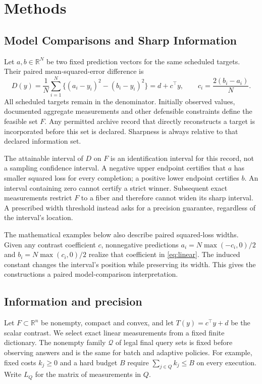 \documentclass[12pt]{article}
\begin{document}
\section{Methods}\label{sec:methods}
\subsection{Model Comparisons and Sharp Information}
Let $a,b\in\mathbb R^N$ be two fixed prediction vectors for the same
scheduled targets. Their paired mean-squared-error difference is
\begin{equation}
 D(y)=\frac1N\sum_{i=1}^N\{(a_i-y_i)^2-(b_i-y_i)^2\}
 =d+c^\top y,\qquad c_i=\frac{2(b_i-a_i)}N.
 \label{eq:linear}
\end{equation}
All scheduled targets remain in the denominator. Initially observed values,
documented aggregate measurements and other defensible constraints define
the feasible set $F$. Any permitted archive record that directly reconstructs
a target is incorporated before this set is declared. Sharpness is always
relative to that declared information set.

The attainable interval of $D$ on $F$ is an identification interval for
this record, not a sampling confidence interval. A negative upper endpoint
certifies that $a$ has smaller squared loss for every completion; a positive
lower endpoint certifies $b$. An interval containing zero cannot certify
a strict winner. Subsequent exact measurements restrict $F$ to a fiber and
therefore cannot widen its sharp interval. A prescribed width threshold
instead asks for a precision guarantee, regardless of the interval's location.

The mathematical examples below also describe paired squared-loss widths.
Given any contrast coefficient $c$, nonnegative predictions
$a_i=N\max(-c_i,0)/2$ and $b_i=N\max(c_i,0)/2$ realize that coefficient
in \eqref{eq:linear}. The induced constant changes the interval's position
while preserving its width. This gives the constructions a paired
model-comparison interpretation.

\subsection{Information and precision}
\label{sec:risk_setup}
Let $F\subset\mathbb R^n$ be nonempty, compact and convex, and let
$T(y)=c^\top y+d$ be the scalar contrast. We select exact linear
measurements from a fixed finite dictionary. The nonempty family
$\mathcal Q$ of legal final query sets is fixed before observing answers
and is the same for batch and adaptive policies. For example, fixed costs
$k_j\geq0$ and a hard budget $B$ require $\sum_{j\in Q}k_j\leq B$ on
every execution. Write $L_Q$ for the matrix of measurements in $Q$.
\end{document}
